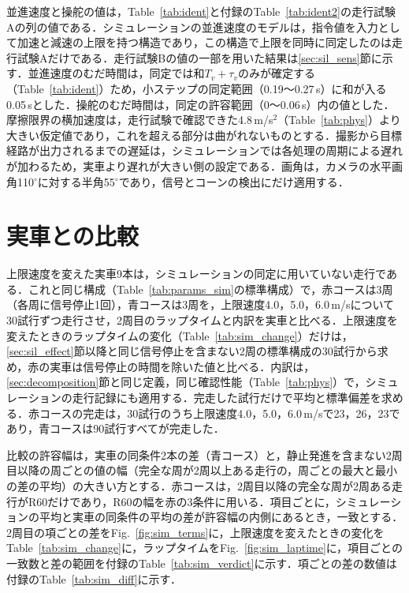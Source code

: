 並進速度と操舵の値は，Table~\ref{tab:ident}と付録のTable~\ref{tab:ident2}の走行試験Aの列の値である．シミュレーションの並進速度のモデルは，指令値を入力として加速と減速の上限を持つ構造であり，この構造で上限を同時に同定したのは走行試験Aだけである．走行試験Bの値の一部を用いた結果は\ref{sec:sil_sens}節に示す．並進速度のむだ時間は，同定では和$T_v+\tau_v$のみが確定する（Table~\ref{tab:ident}）ため，小ステップの同定範囲（0.19〜0.27\,s）に和が入る0.05\,sとした．操舵のむだ時間は，同定の許容範囲（0〜0.06\,s）内の値とした．摩擦限界の横加速度は，走行試験で確認できた4.8\,m/s$^2$（Table~\ref{tab:phys}）より大きい仮定値であり，これを超える部分は曲がれないものとする．撮影から目標経路が出力されるまでの遅延は，シミュレーションでは各処理の周期による遅れが加わるため，実車より遅れが大きい側の設定である．画角は，カメラの水平画角110$^\circ$に対する半角55$^\circ$であり，信号とコーンの検出にだけ適用する．

\section{実車との比較}
\label{sec:sil_validity}
上限速度を変えた実車9本は，シミュレーションの同定に用いていない走行である．これと同じ構成（Table~\ref{tab:params_sim}の標準構成）で，赤コースは3周（各周に信号停止1回），青コースは3周を，上限速度4.0，5.0，6.0\,m/sについて30試行ずつ走行させ，2周目のラップタイムと内訳を実車と比べる．上限速度を変えたときのラップタイムの変化（Table~\ref{tab:sim_change}）だけは，\ref{sec:sil_effect}節以降と同じ信号停止を含まない2周の標準構成の30試行から求め，赤の実車は信号停止の時間を除いた値と比べる．内訳は，\ref{sec:decomposition}節と同じ定義，同じ確認性能（Table~\ref{tab:phys}）で，シミュレーションの走行記録にも適用する．完走した試行だけで平均と標準偏差を求める．赤コースの完走は，30試行のうち上限速度4.0，5.0，6.0\,m/sで23，26，23であり，青コースは90試行すべてが完走した．

比較の許容幅は，実車の同条件2本の差（青コース）と，静止発進を含まない2周目以降の周ごとの値の幅（完全な周が2周以上ある走行の，周ごとの最大と最小の差の平均）の大きい方とする．赤コースは，2周目以降の完全な周が2周ある走行がR60だけであり，R60の幅を赤の3条件に用いる．項目ごとに，シミュレーションの平均と実車の同条件の平均の差が許容幅の内側にあるとき，一致とする．2周目の項ごとの差をFig.~\ref{fig:sim_terms}に，上限速度を変えたときの変化をTable~\ref{tab:sim_change}に，ラップタイムをFig.~\ref{fig:sim_laptime}に，項目ごとの一致数と差の範囲を付録のTable~\ref{tab:sim_verdict}に示す．項ごとの差の数値は付録のTable~\ref{tab:sim_diff}に示す．

